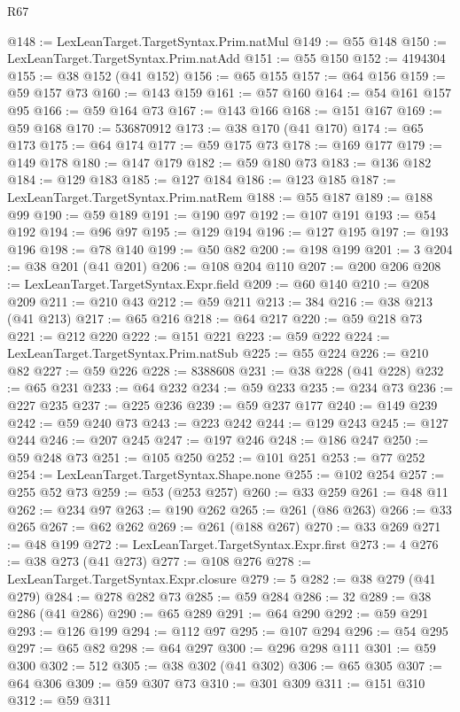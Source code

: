 \begin{lexlean}{R67}
\begin{coremodule}
@148 := LexLeanTarget.TargetSyntax.Prim.natMul
@149 := @55 @148
@150 := LexLeanTarget.TargetSyntax.Prim.natAdd
@151 := @55 @150
@152 := 4194304
@155 := @38 @152 (@41 @152)
@156 := @65 @155
@157 := @64 @156
@159 := @59 @157 @73
@160 := @143 @159
@161 := @57 @160
@164 := @54 @161 @157 @95
@166 := @59 @164 @73
@167 := @143 @166
@168 := @151 @167
@169 := @59 @168
@170 := 536870912
@173 := @38 @170 (@41 @170)
@174 := @65 @173
@175 := @64 @174
@177 := @59 @175 @73
@178 := @169 @177
@179 := @149 @178
@180 := @147 @179
@182 := @59 @180 @73
@183 := @136 @182
@184 := @129 @183
@185 := @127 @184
@186 := @123 @185
@187 := LexLeanTarget.TargetSyntax.Prim.natRem
@188 := @55 @187
@189 := @188 @99
@190 := @59 @189
@191 := @190 @97
@192 := @107 @191
@193 := @54 @192
@194 := @96 @97
@195 := @129 @194
@196 := @127 @195
@197 := @193 @196
@198 := @78 @140
@199 := @50 @82
@200 := @198 @199
@201 := 3
@204 := @38 @201 (@41 @201)
@206 := @108 @204 @110
@207 := @200 @206
@208 := LexLeanTarget.TargetSyntax.Expr.field
@209 := @60 @140
@210 := @208 @209
@211 := @210 @43
@212 := @59 @211
@213 := 384
@216 := @38 @213 (@41 @213)
@217 := @65 @216
@218 := @64 @217
@220 := @59 @218 @73
@221 := @212 @220
@222 := @151 @221
@223 := @59 @222
@224 := LexLeanTarget.TargetSyntax.Prim.natSub
@225 := @55 @224
@226 := @210 @82
@227 := @59 @226
@228 := 8388608
@231 := @38 @228 (@41 @228)
@232 := @65 @231
@233 := @64 @232
@234 := @59 @233
@235 := @234 @73
@236 := @227 @235
@237 := @225 @236
@239 := @59 @237 @177
@240 := @149 @239
@242 := @59 @240 @73
@243 := @223 @242
@244 := @129 @243
@245 := @127 @244
@246 := @207 @245
@247 := @197 @246
@248 := @186 @247
@250 := @59 @248 @73
@251 := @105 @250
@252 := @101 @251
@253 := @77 @252
@254 := LexLeanTarget.TargetSyntax.Shape.none
@255 := @102 @254
@257 := @255 @52 @73
@259 := @53 (@253 @257)
@260 := @33 @259
@261 := @48 @11
@262 := @234 @97
@263 := @190 @262
@265 := @261 (@86 @263)
@266 := @33 @265
@267 := @62 @262
@269 := @261 (@188 @267)
@270 := @33 @269
@271 := @48 @199
@272 := LexLeanTarget.TargetSyntax.Expr.first
@273 := 4
@276 := @38 @273 (@41 @273)
@277 := @108 @276
@278 := LexLeanTarget.TargetSyntax.Expr.closure
@279 := 5
@282 := @38 @279 (@41 @279)
@284 := @278 @282 @73
@285 := @59 @284
@286 := 32
@289 := @38 @286 (@41 @286)
@290 := @65 @289
@291 := @64 @290
@292 := @59 @291
@293 := @126 @199
@294 := @112 @97
@295 := @107 @294
@296 := @54 @295
@297 := @65 @82
@298 := @64 @297
@300 := @296 @298 @111
@301 := @59 @300
@302 := 512
@305 := @38 @302 (@41 @302)
@306 := @65 @305
@307 := @64 @306
@309 := @59 @307 @73
@310 := @301 @309
@311 := @151 @310
@312 := @59 @311

\end{coremodule}
\end{lexlean}
